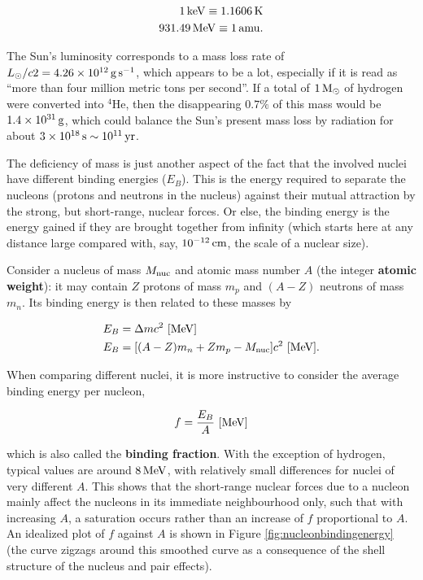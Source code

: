 \documentclass[a4paper,10pt]{article}
\begin{document}
\begin{align*}
    1\,{\rm keV} \equiv 1.1606\,{\rm K} \\
    931.49\,{\rm MeV} \equiv 1\,{\rm amu}.
\end{align*}

{\noindent}The Sun's luminosity corresponds to a mass loss rate of $L_\odot/c2=4.26\times10^{12}\,{\rm g\,s^{-1}}$, which appears to be a lot, especially if it is read as ``more than four million metric tons per second''. If a total of $1\,{\rm M_\odot}$ of hydrogen were converted into $^4$He, then the disappearing $0.7\%$ of this mass would be $1.4\times10^{31}\,{\rm g}$, which could balance the Sun's present mass loss by radiation for about $3\times10^{18}\,{\rm s}\sim10^{11}\,{\rm yr}$.

{\noindent}The deficiency of mass is just another aspect of the fact that the involved nuclei have different binding energies ($E_B$). This is the energy required to separate the nucleons (protons and neutrons in the nucleus) against their mutual attraction by the strong, but short-range, nuclear forces. Or else, the binding energy is the energy gained if they are brought together from infinity (which starts here at any distance large compared with, say, $10^{-12}\,{\rm cm}$, the scale of a nuclear size).

{\noindent}Consider a nucleus of mass $M_{\rm nuc}$ and atomic mass number $A$ (the integer \textbf{atomic weight}): it may contain $Z$ protons of mass $m_p$ and $(A-Z)$ neutrons of mass $m_n$. Its binding energy is then related to these masses by

\begin{align*}
    E_B &= \Delta mc^2 ~ [{\rm MeV}] \\
    E_B &= [(A-Z)m_n+Zm_p-M_{\rm nuc}]c^2  ~ [{\rm MeV}].
\end{align*}

{\noindent}When comparing different nuclei, it is more instructive to consider the average binding energy per nucleon,

\begin{align*}
    f = \frac{E_B}{A} ~ [{\rm MeV}]
\end{align*}

{\noindent}which is also called the \textbf{binding fraction}. With the exception of hydrogen, typical values are around $8\,{\rm MeV}$, with relatively small differences for nuclei of very different $A$. This shows that the short-range nuclear forces due to a nucleon mainly affect the nucleons in its immediate neighbourhood only, such that with increasing $A$, a saturation occurs rather than an increase of $f$ proportional to $A$. An idealized plot of $f$ against $A$ is shown in Figure \ref{fig:nucleonbindingenergy} (the curve zigzags around this smoothed curve as a consequence of the shell structure of the nucleus and pair effects).
\end{document}
